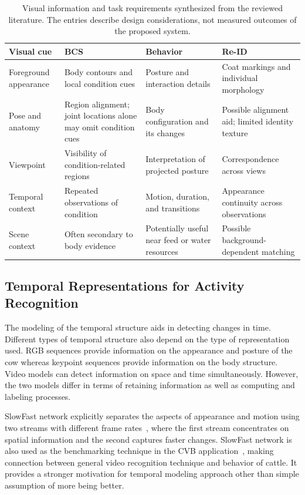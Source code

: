 \begin{table}[tbp]
\centering
\caption[Visual information and task requirements]{Visual information and task requirements synthesized from the reviewed literature. The entries describe design considerations, not measured outcomes of the proposed system.}
\label{tab:ch2_information_requirements}
\small
\begin{tabularx}{\textwidth}{@{}>{\raggedright\arraybackslash}p{2.2cm}YYY@{}}
\toprule
\textbf{Visual cue} & \textbf{BCS} & \textbf{Behavior} & \textbf{Re-ID}\\
\midrule
Foreground appearance & Body contours and local condition cues & Posture and interaction details & Coat markings and individual morphology\\
\addlinespace
Pose and anatomy & Region alignment; joint locations alone may omit condition cues & Body configuration and its changes & Possible alignment aid; limited identity texture\\
\addlinespace
Viewpoint & Visibility of condition-related regions & Interpretation of projected posture & Correspondence across views\\
\addlinespace
Temporal context & Repeated observations of condition & Motion, duration, and transitions & Appearance continuity across observations\\
\addlinespace
Scene context & Often secondary to body evidence & Potentially useful near feed or water resources & Possible background-dependent matching\\
\bottomrule
\end{tabularx}
\end{table}

\subsection{Temporal Representations for Activity Recognition}

The modeling of the temporal structure aids in detecting changes in time. Different types of temporal structure also depend on the type of representation used. RGB sequences provide information on the appearance and posture of the cow whereas keypoint sequences provide information on the body structure. Video models can detect information on space and time simultaneously. However, the two models differ in terms of retaining information as well as computing and labeling processes.

SlowFast network explicitly separates the aspects of appearance and motion using two streams with different frame rates~\cite{feichtenhofer2019slowfast}, where the first stream concentrates on spatial information and the second captures faster changes. SlowFast network is also used as the benchmarking technique in the CVB application~\cite{zia2023cvb}, making connection between general video recognition technique and behavior of cattle. It provides a stronger motivation for temporal modeling approach other than simple assumption of more being better.

